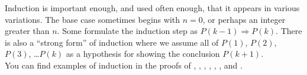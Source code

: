 %
Induction is important enough, and used often enough, that it appears in various variations.  The base case sometimes begins with $n=0$, or perhaps an integer greater than $n$.  Some formulate the induction step as $P(k-1)\Rightarrow P(k)$.  There is also a ``strong form'' of induction where we assume all of $P(1)$, $P(2)$, $P(3)$, \dots $P(k)$ as a hypothesis for showing the conclusion $P(k+1)$.\\
%
You can find examples of induction in the proofs of 
,  %
,     %
,       %
,      %
,   %
,      %
and
.      %